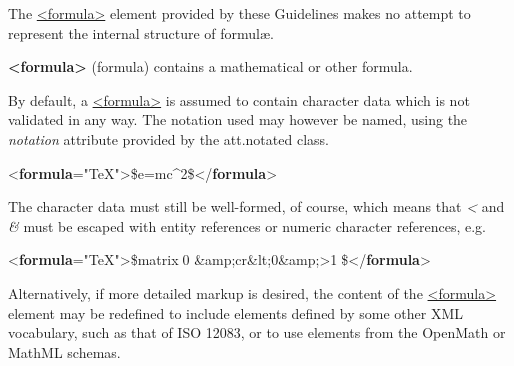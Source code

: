 The \hyperref[TEI.formula]{<formula>} element provided by these Guidelines makes no attempt to represent the internal structure of formulæ. 
\begin{sansreflist}
  
\item [\textbf{<formula>}] (formula) contains a mathematical or other formula.
\end{sansreflist}
\par
By default, a \hyperref[TEI.formula]{<formula>} is assumed to contain character data which is not validated in any way. The notation used may however be named, using the {\itshape notation} attribute provided by the \textsf{att.notated} class. \par\bgroup{}\exampleFont \begin{shaded}\noindent\mbox{}{<\textbf{formula}\hspace*{1em}{notation}="{TeX}">}\$e=mc\textasciicircum 2\${</\textbf{formula}>}\end{shaded}\egroup\par \noindent  The character data must still be well-formed, of course, which means that \textit{<} and \textit{\&} must be escaped with entity references or numeric character references, e.g. \par\bgroup{}\exampleFont \begin{shaded}\noindent\mbox{}{<\textbf{formula}\hspace*{1em}{notation}="{TeX}">}\$⃥matrix❴0 \&amp;\mbox{}⃥cr\&lt;0\&amp;>1❵\${</\textbf{formula}>}\end{shaded}\egroup\par \par
Alternatively, if more detailed markup is desired, the content of the \hyperref[TEI.formula]{<formula>} element may be redefined to include elements defined by some other XML vocabulary, such as that of ISO 12083, or to use elements from the OpenMath or MathML schemas.\par
